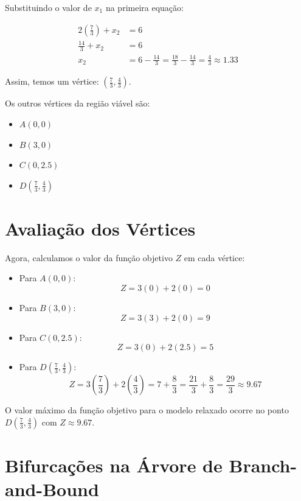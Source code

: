 \documentclass{article}
\begin{document}
Substituindo o valor de \(x_1\) na primeira equação:

\begin{align}
2\left(\frac{7}{3}\right) + x_2 & = 6 \\
\frac{14}{3} + x_2 & = 6 \\
x_2 & = 6 - \frac{14}{3} = \frac{18}{3} - \frac{14}{3} = \frac{4}{3} \approx 1.33
\end{align}

Assim, temos um vértice: \( \left( \frac{7}{3}, \frac{4}{3} \right) \).

Os outros vértices da região viável são:
\begin{itemize}
    \item \(A(0, 0)\)
    \item \(B(3, 0)\)
    \item \(C(0, 2.5)\)
    \item \(D\left( \frac{7}{3}, \frac{4}{3} \right)\)
\end{itemize}

\section{Avaliação dos Vértices}

Agora, calculamos o valor da função objetivo \(Z\) em cada vértice:

\begin{itemize}
    \item Para \(A(0, 0)\):
    \[
    Z = 3(0) + 2(0) = 0
    \]

    \item Para \(B(3, 0)\):
    \[
    Z = 3(3) + 2(0) = 9
    \]

    \item Para \(C(0, 2.5)\):
    \[
    Z = 3(0) + 2(2.5) = 5
    \]

    \item Para \(D\left( \frac{7}{3}, \frac{4}{3} \right)\):
    \[
    Z = 3\left( \frac{7}{3} \right) + 2\left( \frac{4}{3} \right) = 7 + \frac{8}{3} = \frac{21}{3} + \frac{8}{3} = \frac{29}{3} \approx 9.67
    \]
\end{itemize}

O valor máximo da função objetivo para o modelo relaxado ocorre no ponto \(D\left( \frac{7}{3}, \frac{4}{3} \right)\) com \(Z \approx 9.67\).
\section{Bifurcações na Árvore de Branch-and-Bound}
\end{document}
